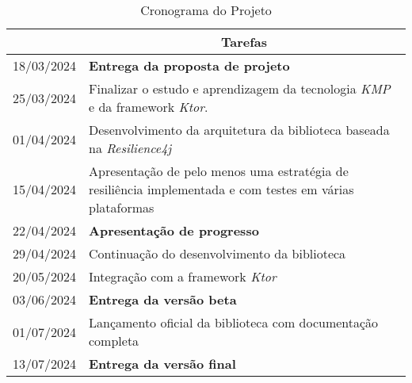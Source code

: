 \begin{table}[h]
    \centering
    \caption{Cronograma do Projeto}
    \label{tab:planning}
    \begin{tabular}{ |c|p{13cm}| }
        \hline
        \centering{\textbf{Data}} &
        \multicolumn{1}{c|}{\textbf{Tarefas}}\\\hline
        18/03/2024 & \textbf{Entrega da proposta de projeto} \\\hline
        25/03/2024 & Finalizar o estudo e aprendizagem da tecnologia \textit{KMP} e da framework \textit{Ktor}.\\\hline
        01/04/2024 & Desenvolvimento da arquitetura da biblioteca baseada na \textit{Resilience4j} \\\hline
        15/04/2024 & Apresentação de pelo menos uma estratégia de resiliência implementada e com testes em várias plataformas \\\hline
        22/04/2024 & \textbf{Apresentação de progresso} \\\hline
        29/04/2024 & Continuação do desenvolvimento da biblioteca \\\hline
        20/05/2024 & Integração com a framework \textit{Ktor} \\\hline
        03/06/2024 & \textbf{Entrega da versão beta} \\\hline
        01/07/2024 & Lançamento oficial da biblioteca com documentação completa \\\hline
        13/07/2024 & \textbf{Entrega da versão final} \\\hline
    \end{tabular}
\end{table}
